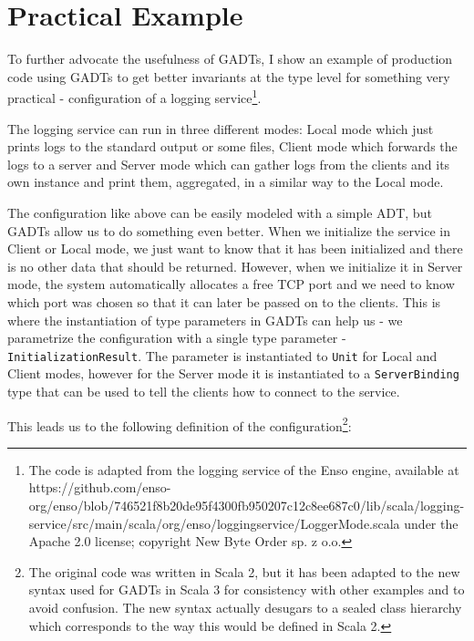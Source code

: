 \section{Practical Example}

To further advocate the usefulness of GADTs, I show an example of production code using GADTs to get better invariants at the type level for something very practical - configuration of a logging service\footnote{The code is adapted from the logging service of the Enso engine, available at https://github.com/enso-org/enso/blob/746521f8b20de95f4300fb950207c12c8ee687c0/lib/scala/logging-service/src/main/scala/org/enso/loggingservice/LoggerMode.scala under the Apache 2.0 license; copyright New Byte Order sp. z o.o.}. 


The logging service can run in three different modes: Local mode which just prints logs to the standard output or some files, Client mode which forwards the logs to a server and Server mode which can gather logs from the clients and its own instance and print them, aggregated, in a similar way to the Local mode.

The configuration like above can be easily modeled with a simple ADT, but GADTs allow us to do something even better. When we initialize the service in Client or Local mode, we just want to know that it has been initialized and there is no other data that should be returned. However, when we initialize it in Server mode, the system automatically allocates a free TCP port and we need to know which port was chosen so that it can later be passed on to the clients. This is where the instantiation of type parameters in GADTs can help us - we parametrize the configuration with a single type parameter - \texttt{InitializationResult}. The parameter is instantiated to \texttt{Unit} for Local and Client modes, however for the Server mode it is instantiated to a \texttt{ServerBinding} type that can be used to tell the clients how to connect to the service.

This leads us to the following definition of the configuration\footnote{The original code was written in Scala 2, but it has been adapted to the new syntax used for GADTs in Scala 3 for consistency with other examples and to avoid confusion. The new syntax actually desugars to a sealed class hierarchy which corresponds to the way this would be defined in Scala 2.}:

